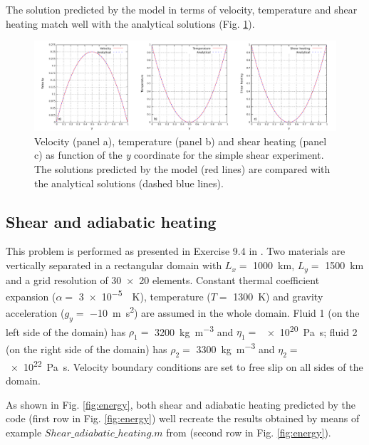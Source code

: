 \documentclass[hidelinks,10pt,a4paper]{article}
\begin{document}
The solution predicted by the model in terms of velocity, temperature and shear heating match well with the analytical solutions (Fig. \ref{fig:analytical_en}).


\begin{figure}
\centering
\noindent\includegraphics[width=500px]{./Figures/Analytical_Shear.pdf}
\caption{Velocity (panel a), temperature (panel b) and shear heating (panel c) as function of the \textit{y} coordinate for the simple shear experiment. The
solutions predicted by the model (red lines) are compared with the analytical solutions (dashed blue lines).}
\label{fig:analytical_en}
\end{figure}

\subsection{Shear and adiabatic heating}\label{sec:shear}
This problem is performed as presented in Exercise 9.4 in \citet{Gerya2010b}. Two materials are vertically separated in a rectangular domain with $L_x=$
\SI{1000}{\km}, $L_y=$ \SI{1500}{\km} and a grid resolution of \num{30x20} elements. Constant thermal coefficient expansion ($\alpha=$ \SI{3e-5}{\per\kelvin}),
temperature ($T=$ \SI{1300}{\kelvin}) and gravity acceleration ($g_y=$ \SI{-10}{\m\square\s}) are assumed in the whole domain. Fluid 1 (on the left side of the
domain) has $\rho_1=$ \SI{3200}{\kg\per\cubic\m} and $\eta_1=$ \SI{e20}{\pascal\s}; fluid 2 (on the right side of the domain) has $\rho_2=$
\SI{3300}{\kg\per\cubic\m} and $\eta_2=$ \SI{e22}{\pascal\s}. Velocity boundary conditions are set to free slip on all sides of the domain. 

As shown in Fig. \ref{fig:energy}, both shear and adiabatic heating predicted by the code (first row in Fig. \ref{fig:energy}) well recreate the results
obtained by means of example ${Shear\_adiabatic\_heating.m}$ from \citet{Gerya2010b} (second row in Fig. \ref{fig:energy}).
\end{document}
